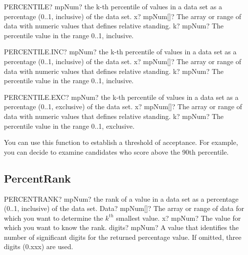 \begin{mpFunctionsExtract}
	\mpWorksheetFunctionTwoNotImplemented
	{PERCENTILE? mpNum? the k-th percentile of values  in a data set as a percentage (0..1, inclusive) of the data set.}
	{x? mpNum[]?  The array or range of data with numeric values that defines relative standing.}
	{k? mpNum? The percentile value in the range 0..1, inclusive.}
\end{mpFunctionsExtract}


\vspace{0.6cm}
\begin{mpFunctionsExtract}
	\mpWorksheetFunctionTwoNotImplemented
	{PERCENTILE.INC? mpNum? the k-th percentile of values  in a data set as a percentage (0..1, inclusive) of the data set.}
	{x? mpNum[]?  The array or range of data with numeric values that defines relative standing.}
	{k? mpNum? The percentile value in the range 0..1, inclusive.}
\end{mpFunctionsExtract}


\vspace{0.6cm}
\begin{mpFunctionsExtract}
	\mpWorksheetFunctionTwoNotImplemented
	{PERCENTILE.EXC? mpNum? the k-th percentile of values  in a data set as a percentage (0..1, exclusive) of the data set.}
	{x? mpNum[]?  The array or range of data with numeric values that defines relative standing.}
	{k? mpNum? The percentile value in the range 0..1, exclusive.}
\end{mpFunctionsExtract}


\vspace{0.3cm}
You can use this function to establish a threshold of acceptance. For example, you can decide to examine candidates who score above the 90th percentile.







\subsection{PercentRank}


\begin{mpFunctionsExtract}
	\mpWorksheetFunctionThreeNotImplemented
	{PERCENTRANK? mpNum? the rank of a value in a data set as a percentage (0..1, inclusive) of the data set.}
	{Data? mpNum[]?  The array or range of data for which you want to determine the $k^{th}$ smallest  value.}
	{x? mpNum? The value for which you want to know the rank.}
	{digits? mpNum? A value that identifies the number of significant digits for the returned percentage value. If omitted, three digits (0.xxx) are used.}
\end{mpFunctionsExtract}


